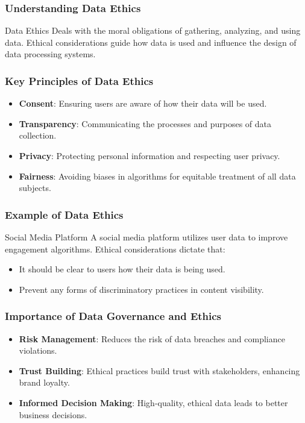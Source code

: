 \documentclass[aspectratio=169]{beamer}
\begin{document}
\begin{frame}[fragile]
    \frametitle{Understanding Data Ethics}
    \begin{block}{Data Ethics}
      Deals with the moral obligations of gathering, analyzing, and using data. Ethical considerations guide how data is used and influence the design of data processing systems.
    \end{block}
\end{frame}

\begin{frame}[fragile]
    \frametitle{Key Principles of Data Ethics}
    \begin{itemize}
        \item \textbf{Consent}: Ensuring users are aware of how their data will be used.
        \item \textbf{Transparency}: Communicating the processes and purposes of data collection.
        \item \textbf{Privacy}: Protecting personal information and respecting user privacy.
        \item \textbf{Fairness}: Avoiding biases in algorithms for equitable treatment of all data subjects.
    \end{itemize}
\end{frame}

\begin{frame}[fragile]
    \frametitle{Example of Data Ethics}
    \begin{block}{Social Media Platform}
        A social media platform utilizes user data to improve engagement algorithms. Ethical considerations dictate that:
        \begin{itemize}
            \item It should be clear to users how their data is being used.
            \item Prevent any forms of discriminatory practices in content visibility.
        \end{itemize}
    \end{block}
\end{frame}

\begin{frame}[fragile]
    \frametitle{Importance of Data Governance and Ethics}
    \begin{itemize}
        \item \textbf{Risk Management}: Reduces the risk of data breaches and compliance violations.
        \item \textbf{Trust Building}: Ethical practices build trust with stakeholders, enhancing brand loyalty.
        \item \textbf{Informed Decision Making}: High-quality, ethical data leads to better business decisions.
    \end{itemize}
\end{frame}
\end{document}

